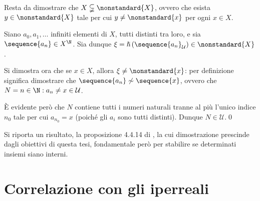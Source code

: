 {    Resta da dimostrare che $ X \subsetneqq \nonstandard{X} $, ovvero che esista $ y \in \nonstandard{X} $ tale per cui $ y\neq \nonstandard{x} $ per ogni $ x \in X $. 

    Siano $ a_0,a_1,\dots $ infiniti elementi di $ X $, tutti distinti tra loro, e sia $ \sequence{a_{n} } \in X^{\N} $. Sia dunque $ \xi = \hslash\left(\sequence{a_{n} }_{\mathcal{U}}\right) \in \nonstandard{X} $.

    Si dimostra ora che se $ x \in X $, allora $ \xi\neq \nonstandard{x} $: per definizione significa dimostrare che $ \sequence{a_{n} }\not\sim \sequence{x} $, ovvero che $ N={n \in \N: a_{n}\neq x } \in \mathcal{U} $. 

    È evidente però che $ N $ contiene tutti i numeri naturali tranne al più l'unico indice $ n_0 $ tale per cui $ a_{n_0}= x  $ (poiché gli $ a_i $ sono tutti distinti). Dunque $ N \in  \mathcal{U} $.\qed
}



Si riporta un risultato, la proposizione 4.4.14 di \cite{chang_model_2012}, la cui dimostrazione prescinde dagli obiettivi di questa tesi, fondamentale però per stabilire se determinati insiemi siano interni. 



\section{Correlazione con gli iperreali}

